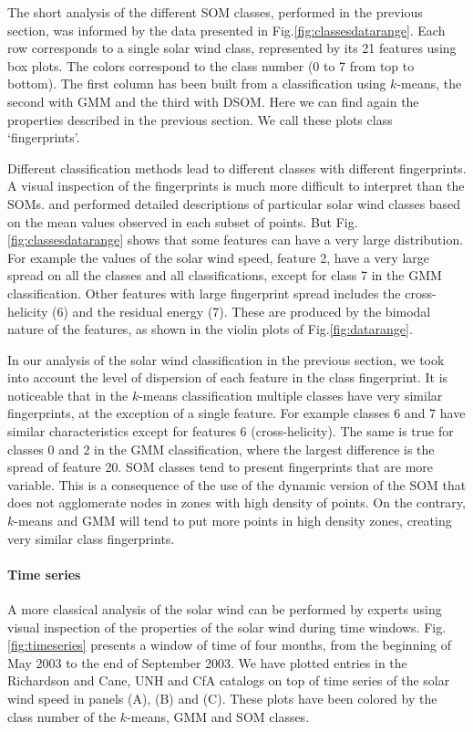 The short analysis of the different SOM classes, performed in the previous section, was informed by the data presented in Fig.\ref{fig:classesdatarange}. Each row corresponds to a single solar wind class, represented by its 21 features using box plots. The colors correspond to the class number (0 to 7 from top to bottom). The first column has been built from a classification using $k$-means, the second with GMM and the third with DSOM. Here we can find again the properties described in the previous section. We call these plots class `fingerprints'.

Different classification methods lead to different classes with different fingerprints. A visual inspection of the fingerprints is much more difficult to interpret than the SOMs. \citep{Roberts2020} and \citep{Xu2015b} performed detailed descriptions of particular solar wind classes based on the mean values observed in each subset of points. But Fig.\ref{fig:classesdatarange} shows that some features can have a very large distribution. For example the values of the solar wind speed, feature 2, have a very large spread on all the classes and all classifications, except for class 7 in the GMM classification. Other features with large fingerprint spread includes the cross-helicity (6) and the residual energy (7). These are produced by the bimodal nature of the features, as shown in the violin plots of Fig.\ref{fig:datarange}.

In our analysis of the solar wind classification in the previous section, we took into account the level of dispersion of each feature in the class fingerprint. It is noticeable that in the $k$-means classification multiple classes have very similar fingerprints, at the exception of a single feature. For example classes 6 and 7 have similar characteristics except for features 6 (cross-helicity). The same is true for classes 0 and 2 in the GMM classification, where the largest difference is the spread of feature 20. SOM classes tend to present fingerprints that are more variable. This is a consequence of the use of the dynamic version of the SOM that does not agglomerate nodes in zones with high density of points. On the contrary, $k$-means and GMM will tend to put more points in high density zones, creating very similar class fingerprints.

\paragraph{Time series}
A more classical analysis of the solar wind can be performed by experts using visual inspection of the properties of the solar wind during time windows. Fig.\ref{fig:timeseries} presents a window of time of four months, from the beginning of May 2003 to the end of September 2003. We have plotted entries in the Richardson and Cane, UNH and CfA catalogs on top of time series of the solar wind speed in panels (A), (B) and (C). These plots have been colored by the class number of the $k$-means, GMM and SOM classes.

